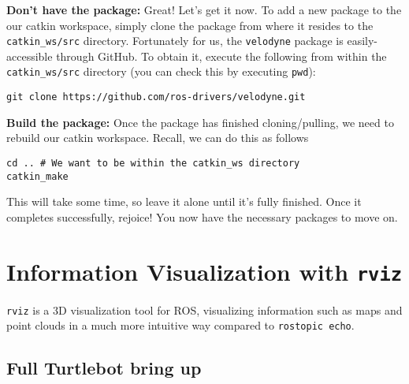 \documentclass{article}
\begin{document}
{\bf Don't have the package:} Great! Let's get it now. To add a new package to the our catkin workspace, simply clone the package from where it resides to the \texttt{catkin\_ws/src} directory. Fortunately for us, the \texttt{velodyne} package is easily-accessible through GitHub. To obtain it, execute the following from within the \texttt{catkin\_ws/src} directory (you can check this by executing \texttt{pwd}):
\begin{lstlisting}
git clone https://github.com/ros-drivers/velodyne.git
\end{lstlisting}

{\bf Build the package:}
Once the package has finished cloning/pulling, we need to rebuild our catkin workspace. Recall, we can do this as follows
\begin{lstlisting}
cd .. # We want to be within the catkin_ws directory
catkin_make
\end{lstlisting}

This will take some time, so leave it alone until it's fully finished. Once it completes successfully, rejoice! You now have the necessary packages to move on.

\section{Information Visualization with \texttt{rviz}}

\texttt{rviz} is a 3D visualization tool for ROS, visualizing information such as maps and point clouds in a much more intuitive way compared to \texttt{rostopic echo}.

\subsection{Full Turtlebot bring up}


\end{document}
